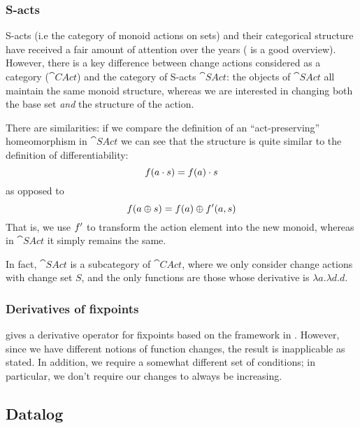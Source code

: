 \subsubsection{S-acts}
\label{sec:sacts}

S-acts (i.e the category of monoid actions on sets) and their categorical structure have received a fair amount of attention
over the years (\textcite{kilp2000monoids} is a good
overview). However, there is a key difference between change actions considered
as a category ($\cat{CAct}$) and the category of
S-acts $\cat{SAct}$: the objects of $\cat{SAct}$ all maintain the same monoid
structure, whereas we are interested in changing both the base set \emph{and} the structure of the action.

There are similarities: if we compare the definition of an ``act-preserving''
homeomorphism in $\cat{SAct}$ \autocite[see][]{kilp2000monoids} we can see that the structure is
quite similar to the definition of differentiability:
\begin{displaymath}
  f(a \cdot s) = f(a) \cdot s
\end{displaymath}
as opposed to
\begin{displaymath}
  f(a \oplus s) = f(a) \oplus f'(a, s)
\end{displaymath}
That is, we use $f'$ to transform the action element into the new
monoid, whereas in $\cat{SAct}$ it simply remains the same.

In fact, $\cat{SAct}$ is a subcategory of $\cat{CAct}$, where we only
consider change actions with change set $S$, and the only functions are those
whose derivative is $\lambda a. \lambda d. d$.

\subsubsection{Derivatives of fixpoints}

\textcite{arntz2017fixpoints} gives a derivative operator for fixpoints based on
the framework in \textcite{cai2014changes}. However, since we have different
notions of function changes, the result is inapplicable as
stated. In addition, we require a somewhat different set of conditions; in particular, we
don't require our changes to always be increasing.

\subsection{Datalog}

